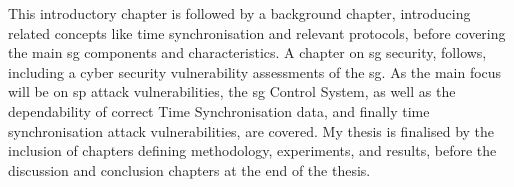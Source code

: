This introductory chapter is followed by a background chapter, introducing related concepts like time synchronisation and relevant protocols, before covering the main \acrlong{sg} components and characteristics.
A chapter on \acrlong{sg} security, follows, including a cyber security vulnerability assessments of the \acrshort{sg}. As the main focus will be on \acrshort{sp} attack vulnerabilities, the \acrshort{sg} Control System, as well as the dependability of correct Time Synchronisation data, and finally time synchronisation attack vulnerabilities, are covered. 
My thesis is finalised by the inclusion of chapters defining methodology, experiments, and results, before the discussion and conclusion chapters at the end of the thesis. 

